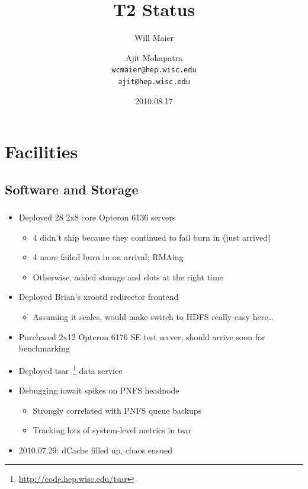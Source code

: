 \documentclass{beamer}
\title{T2 Status}
\author[Maier, Mohapatra]{
    Will Maier \and Ajit Mohapatra\\
    {\tt wcmaier@hep.wisc.edu}\\
    {\tt ajit@hep.wisc.edu}}
\institute[Wisconsin]{University of Wisconsin - High Energy Physics}
\date{2010.08.17}
\begin{document}
\begin{frame}
    \titlepage
\end{frame}


\section{Facilities}
\subsection{Software and Storage}
\begin{frame}
\frametitle{}

\begin{itemize}
    \item Deployed 28 2x8 core Opteron 6136 servers
    \begin{itemize}
        \item 4 didn't ship because they continued to fail burn in (just arrived)
        \item 4 more failed burn in on arrival; RMAing
        \item Otherwise, added storage and slots at the right time
    \end{itemize}
    \item Deployed Brian's xrootd redirector frontend
    \begin{itemize}
        \item Assuming it scales, would make switch to HDFS really easy here\ldots{}
    \end{itemize}
    \item Purchased 2x12 Opteron 6176 SE test server; should arrive soon for benchmarking
    \item Deployed tsar~\footnote{\url{http://code.hep.wisc.edu/tsar}} data service
    \item Debugging iowait spikes on PNFS headnode
    \begin{itemize}
        \item Strongly correlated with PNFS queue backups
        \item Tracking lots of system-level metrics in tsar
    \end{itemize}
    \item 2010.07.29: dCache filled up, chaos ensued
\end{itemize}
\end{frame}
\end{document}
